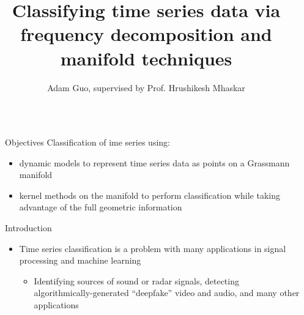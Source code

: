 \documentclass[final]{beamer}
\title{Classifying time series data via frequency decomposition and manifold techniques} %
\author{Adam Guo, supervised by Prof. Hrushikesh Mhaskar} %
\institute{Pomona College ('22), Claremont Graduate University} %
\newlength{\sepwid}
\newlength{\onecolwid}
\begin{document}

\setlength{\belowcaptionskip}{2ex} %
\setlength\belowdisplayshortskip{2ex} %

\begin{frame}[t] %

\begin{columns}[t] %

\begin{column}{\sepwid}\end{column} %

\begin{column}{\onecolwid} %


\begin{alertblock}{Objectives}
   Classification of ime series using:
    \begin{itemize}
        \item dynamic models to represent time series data as points on a Grassmann manifold
        \item  kernel methods on the manifold to perform classification while taking
            advantage of the full geometric information
    \end{itemize}
\end{alertblock}


\begin{block}{Introduction}
    \begin{itemize}
        \item Time series classification is a  problem with many applications in signal processing and machine
            learning
\begin{itemize}
\item Identifying sources of sound or radar signals, detecting algorithmically-generated
            ``deepfake'' video and audio, and many other applications


\end{itemize}
\end{itemize}
\end{block}
\end{column}
\end{columns}
\end{frame}
\end{document}
